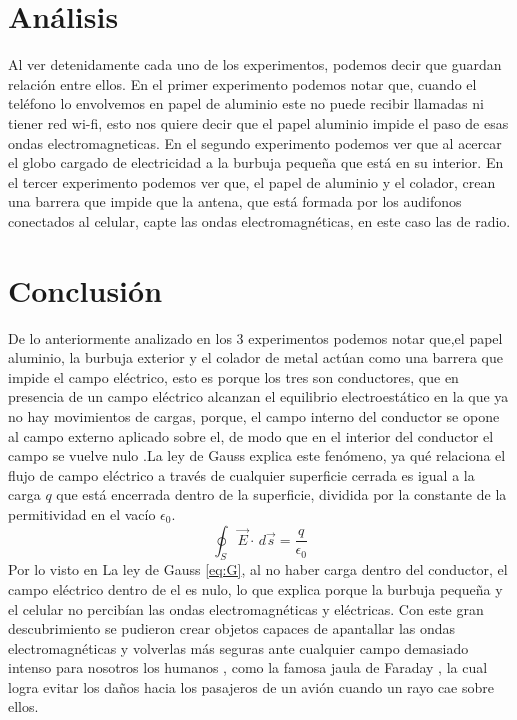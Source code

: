 \documentclass[]{article}
\begin{document}
\begin{multicols*}{2}
    
\section*{Análisis}
Al ver detenidamente cada uno de los experimentos, podemos decir que guardan relación entre ellos.
En el primer experimento podemos notar que, cuando el teléfono lo envolvemos en papel de aluminio este no puede recibir llamadas ni tiener red wi-fi, esto nos quiere decir que el papel aluminio impide el paso de esas ondas electromagneticas.
En el segundo experimento podemos ver que al acercar el globo cargado de electricidad a la burbuja pequeña que está en su interior.%
En el tercer experimento podemos ver que, el papel de aluminio y el colador, crean una barrera que impide que la antena, que está formada por los audifonos conectados al celular, capte las ondas electromagnéticas, en este caso las de radio.



\section*{Conclusión}
De lo anteriormente analizado en los 3 experimentos podemos notar que,el papel aluminio, la burbuja exterior y el colador de metal actúan como una barrera que impide el campo eléctrico, esto es porque los tres son conductores, que en presencia de un campo eléctrico alcanzan el equilibrio electroestático en la que ya no hay movimientos de cargas, porque, el campo interno del conductor se opone al campo externo aplicado sobre el, de modo que en el interior del conductor el campo se vuelve nulo \cite{Electrostatica}.La ley de Gauss explica este fenómeno, ya qué relaciona el flujo de campo eléctrico a través de cualquier superficie cerrada es igual a la carga $q$ que está encerrada dentro de la superficie, dividida por la constante de la permitividad en el vacío $\epsilon_0$.
\begin{equation}\label{eq:G}
\oint_S \! \vec{E} \cdot  \, d\vec{s} = \dfrac{q}{\epsilon_0}
\end{equation}
Por lo visto en La ley de Gauss \ref{eq:G}, al no haber carga dentro del conductor, el campo eléctrico dentro de el es nulo, lo que explica porque la burbuja pequeña y el celular no percibían las ondas electromagnéticas y eléctricas.
Con este gran descubrimiento se pudieron crear objetos capaces de apantallar las ondas electromagnéticas y volverlas más seguras ante cualquier campo demasiado intenso para nosotros los humanos , como la famosa jaula de Faraday , la cual logra evitar los daños hacia los pasajeros de un avión cuando un rayo cae sobre ellos.


\end{multicols*}
\end{document}
